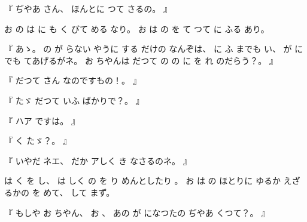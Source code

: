 
%
『
ぢやあ
さん、
%
ほんとに
つて
さるの。
』

%
お
の
は
に
も
く
びて
める
なり。
%
お
は
の
を
て
つて
に
ふる
あり。

%
『
あゝ。
%
の
が
らない
やうに
する
だけの
なんぞは、
に
ふ
までも
い、
%
が
にでも
てあげるがネ。
%
お
ちやんは
だつて
の
の
に
を
れ
のだらう？。
』

%
『
だつて
さん
なのですもの！。
』

%
『
たゞ
だつて
いふ
ばかりで？。
』

%
『
ハア
ですは。
』

%
『
く
たゞ？。
』

%
『
いやだ
ネエ、
%
だか
アしく
き
なさるのネ。
』

%
は
く
を
し、
%
は
しく
の
を
り
めんとしたり
。
%
%
お
は
の
ほとりに
ゆるか
えざるかの
を
めて、
%
して
まず。

%
『
もしや
お
ちやん、
%
お
、
%
あの
が
になつたの
ぢやあ
くつて？。
』

